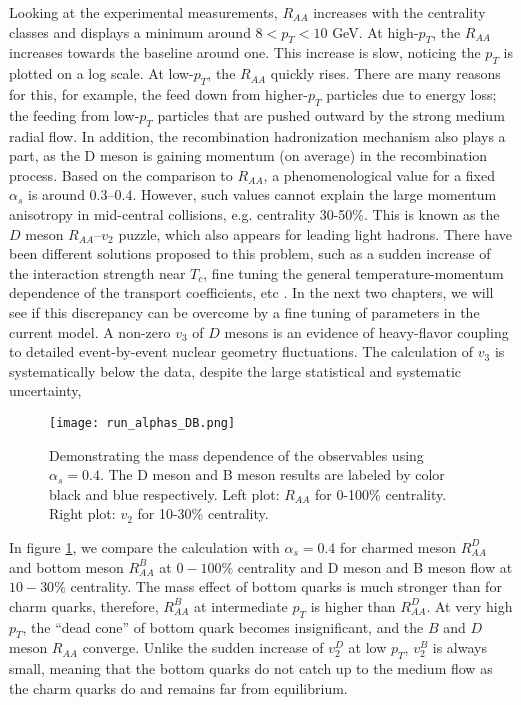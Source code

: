 Looking at the experimental measurements, $R_{AA}$ increases with the centrality classes and displays a minimum around $8 < p_T < 10$ GeV.
At high-$p_T$, the $R_{AA}$ increases towards the baseline around one. 
This increase is slow, noticing the $p_T$ is plotted on a log scale.
At low-$p_T$, the $R_{AA}$ quickly rises.
There are many reasons for this, for example, the feed down from higher-$p_T$ particles due to energy loss;  the feeding from low-$p_T$ particles that are pushed outward by the strong medium radial flow.
In addition, the recombination hadronization mechanism also plays a part, as the D meson is gaining momentum (on average) in the recombination process.
Based on the comparison to $R_{AA}$, a phenomenological value for a fixed $\alpha_s$ is around $0.3$--$0.4$.
However, such values cannot explain the large momentum anisotropy in mid-central collisions, e.g. centrality 30-50\%.
This is known as the $D$ meson $R_{AA}$--$v_2$ puzzle, which also appears for leading light hadrons.
There have been different solutions proposed to this problem, such as a sudden increase of the interaction strength near $T_c$, fine tuning the general temperature-momentum dependence of the transport coefficients, etc \cite{SCARDINA2016329,Xu:2017obm,Shi:2018vys}.
In the next two chapters, we will see if this discrepancy can be overcome by a fine tuning of parameters in the current model.
A non-zero $v_3$ of $D$ mesons is an evidence of heavy-flavor coupling to detailed event-by-event nuclear geometry fluctuations.
The calculation of $v_3$ is systematically below the data, despite the large statistical and systematic uncertainty,

\begin{figure}
\singlespacing
\centering
\texttt{[image: run\_alphas\_DB.png]}
\caption[Demonstrating the mass dependence of the observables using]{Demonstrating the mass dependence of the observables using $\alpha_s = 0.4$. 
The D meson and B meson results are labeled by color black and blue respectively.
Left plot: $R_{AA}$ for 0-100\% centrality. Right plot: $v_2$ for 10-30\% centrality.}
\label{fig:new:charm-bottom}
\end{figure}

In figure \ref{fig:new:charm-bottom}, we compare the calculation with $\alpha_s = 0.4$ for charmed meson $R_{AA}^D$ and bottom meson $R_{AA}^B$ at $0-100\%$ centrality and D meson and B meson flow at $10-30\%$ centrality.
The mass effect of bottom quarks is much stronger than for charm quarks, therefore, $R_{AA}^B$ at intermediate $p_T$ is higher than $R_{AA}^D$. 
At very high $p_T$, the ``dead cone'' of bottom quark becomes insignificant, and the $B$ and $D$ meson $R_{AA}$ converge.
Unlike the sudden increase of $v_2^D$ at low $p_T$, $v_2^B$ is always small, meaning that the bottom quarks do not catch up to the medium flow as the charm quarks do and remains far from equilibrium.

